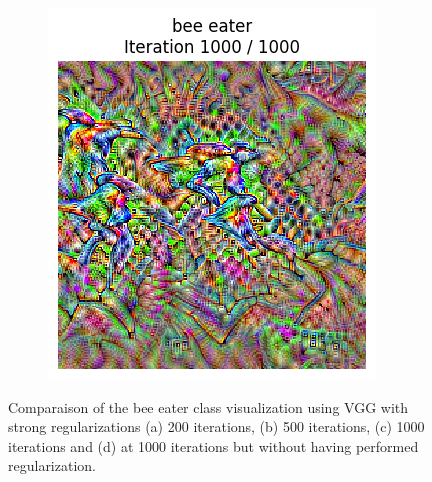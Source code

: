 \begin{figure}[H]
\begin{subfigure}[t]{.25\textwidth}
        \includegraphics[width=\linewidth]{VGG/VGG_bird_animated_1000_last_frame.png}
        \caption{}
        \label{fig:class_viz_iter_vgg:sub4}
    \end{subfigure}
    \caption{Comparaison of the bee eater class visualization using VGG with strong regularizations (a) 200 iterations, (b) 500 iterations, (c) 1000 iterations and (d) at 1000 iterations but without having performed regularization.}
    \label{fig:class_viz_iter_vgg}
\end{figure}

